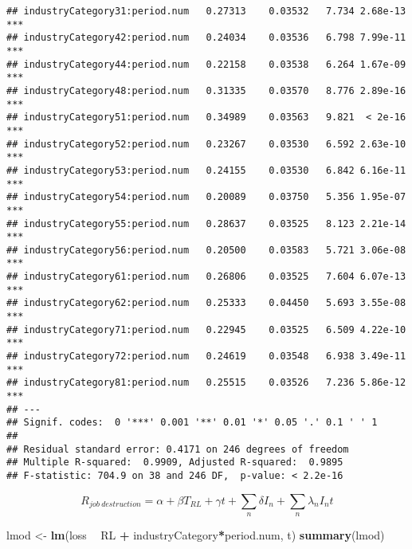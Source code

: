 \documentclass[
]{article}
\newenvironment{Shaded}{\begin{snugshade}}{\end{snugshade}}
\newcommand{\KeywordTok}[1]{\textcolor[rgb]{0.13,0.29,0.53}{\textbf{#1}}}
\newcommand{\NormalTok}[1]{#1}
\newcommand{\OperatorTok}[1]{\textcolor[rgb]{0.81,0.36,0.00}{\textbf{#1}}}
\newcommand{\StringTok}[1]{\textcolor[rgb]{0.31,0.60,0.02}{#1}}
\begin{document}
\begin{verbatim}
## industryCategory31:period.num   0.27313    0.03532   7.734 2.68e-13 ***
## industryCategory42:period.num   0.24034    0.03536   6.798 7.99e-11 ***
## industryCategory44:period.num   0.22158    0.03538   6.264 1.67e-09 ***
## industryCategory48:period.num   0.31335    0.03570   8.776 2.89e-16 ***
## industryCategory51:period.num   0.34989    0.03563   9.821  < 2e-16 ***
## industryCategory52:period.num   0.23267    0.03530   6.592 2.63e-10 ***
## industryCategory53:period.num   0.24155    0.03530   6.842 6.16e-11 ***
## industryCategory54:period.num   0.20089    0.03750   5.356 1.95e-07 ***
## industryCategory55:period.num   0.28637    0.03525   8.123 2.21e-14 ***
## industryCategory56:period.num   0.20500    0.03583   5.721 3.06e-08 ***
## industryCategory61:period.num   0.26806    0.03525   7.604 6.07e-13 ***
## industryCategory62:period.num   0.25333    0.04450   5.693 3.55e-08 ***
## industryCategory71:period.num   0.22945    0.03525   6.509 4.22e-10 ***
## industryCategory72:period.num   0.24619    0.03548   6.938 3.49e-11 ***
## industryCategory81:period.num   0.25515    0.03526   7.236 5.86e-12 ***
## ---
## Signif. codes:  0 '***' 0.001 '**' 0.01 '*' 0.05 '.' 0.1 ' ' 1
## 
## Residual standard error: 0.4171 on 246 degrees of freedom
## Multiple R-squared:  0.9909, Adjusted R-squared:  0.9895 
## F-statistic: 704.9 on 38 and 246 DF,  p-value: < 2.2e-16
\end{verbatim}

\[R_{job \ destruction} = \alpha + \beta T_{RL} + \gamma t + \sum_n \delta I_n + \sum_n \lambda_n I_n t\]

\begin{Shaded}
\begin{Highlighting}[]
\NormalTok{lmod <-}\StringTok{ }\KeywordTok{lm}\NormalTok{(loss }\OperatorTok{~}\StringTok{ }\NormalTok{RL }\OperatorTok{+}\StringTok{ }\NormalTok{industryCategory}\OperatorTok{*}\NormalTok{period.num, t)}
\KeywordTok{summary}\NormalTok{(lmod)}
\end{Highlighting}
\end{Shaded}
\end{document}
